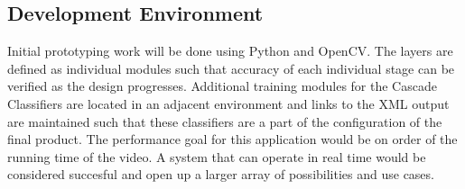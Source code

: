 \subsection{Development Environment}
Initial prototyping work will be done using Python and OpenCV.
The layers are defined as individual modules such that accuracy of each individual stage can be verified as the design progresses.
Additional training modules for the Cascade Classifiers are located in an adjacent environment
and links to the XML output are maintained such that these classifiers are a part of the configuration of the final product.
The performance goal for this application would be on order of the running time of the video.
A system that can operate in real time would be considered succesful and open up a larger array of possibilities and use cases.

